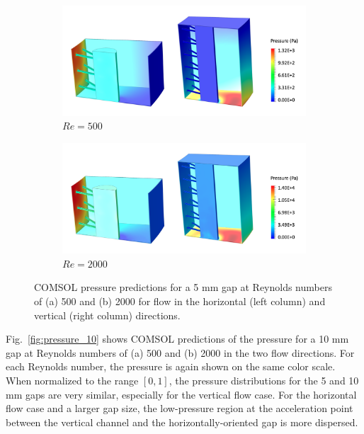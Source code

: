\begin{figure}[!htb]
\centering
\begin{subfigure}{\textwidth}
  \centering
  \includegraphics[width=0.8\linewidth]{figs/Re500_cm05_p.png}
  \caption{\(Re=500\)}
\end{subfigure}
\begin{subfigure}{\textwidth}
  \centering
  \includegraphics[width=0.8\linewidth]{figs/Re2000_cm05_p.png}
  \caption{\(Re=2000\)}
\end{subfigure}
\caption{COMSOL pressure predictions for a 5 \si{\milli\meter} gap at Reynolds numbers of (a) 500 and (b) 2000 for flow in the horizontal (left column) and vertical (right column) directions.}
\label{fig:pressure_5}
\end{figure}

Fig.\ \ref{fig:pressure_10} shows COMSOL predictions of the pressure for a 10 \si{\milli\meter} gap at Reynolds numbers of (a) 500 and (b) 2000 in the two flow directions. For each Reynolds number, the pressure is again shown on the same color scale. When normalized to the range \(\left\lbrack0, 1\right\rbrack\), the pressure distributions for the 5 and 10 \si{\milli\meter} gaps are very similar, especially for the vertical flow case. For the horizontal flow case and a larger gap size, the low-pressure region at the acceleration point between the vertical channel and the horizontally-oriented gap is more dispersed.

